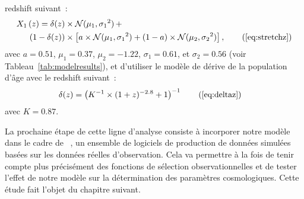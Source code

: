 \documentclass[../main/main.tex]{subfiles}
\begin{document}
\begin{enumerate}
        redshift suivant~:
        \begin{align*}\label{eqconclusion:stretchz}
            X_1\left(z \right) =
            \delta(z)&\times\mathcal{N}(\mu_1,\sigma_1{}^2)\,+\nonumber\\
            (1-\delta(z))&\times \left[a\times\mathcal{N}(\mu_1,\sigma_1{}^2) +
            (1-a)\times\mathcal{N}(\mu_2,\sigma_2{}^2)\right],
            \tag{\ref{eq:stretchz}}
        \end{align*}
        avec $a=0.51$, $\mu_1=0.37$, $\mu_2=-1.22$, $\sigma_1=0.61$, et
        $\sigma_2=0.56$ (voir Tableau~\ref{tab:modelresults}), et d'utiliser
        le modèle de dérive de la population d'âge avec le redshift suivant~:
        \begin{align*}
            \delta(z) & = \left( K^{-1} \times (1+z)^{-2.8} +1 \right)^{-1}
            \tag{\ref{eq:deltaz}}
        \end{align*}
        avec $K=0.87$.
\end{enumerate}

La prochaine étape de cette ligne d'analyse consiste à incorporer notre modèle
dans le cadre de \snana\ \citep{kessler2009a}, un ensemble de logiciels de
production de données simulées basées sur les données réelles d'observation.
Cela va permettre à la fois de tenir compte plus précisément des fonctions de
sélection observationnelles et de tester l'effet de notre modèle sur la
détermination des paramètres cosmologiques. Cette étude fait l'objet du chapitre
suivant.

% 
% 
\end{document}
